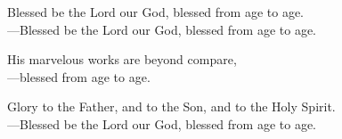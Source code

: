 \responsory

\noindent Blessed be the Lord our God, blessed from age to age.\\
{\color{red}---\thinspace}Blessed be the Lord our God, blessed from age to age.

\medskip\noindent His marvelous works are beyond compare,\\
{\color{red}---\thinspace}blessed from age to age.

\medskip\noindent Glory to the Father, and to the Son, and to the Holy Spirit.\\
{\color{red}---\thinspace}Blessed be the Lord our God, blessed from age to age.
